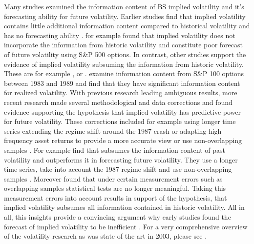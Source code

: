 Many studies examined the information content of \gls{BS} implied volatility and it's forecasting ability for future volatility. Earlier studies find that implied volatility contains little additional information content compared to historical volatility and has no forecasting ability \parencite{jiang2003}. \textcite{canina1993} for example found that implied volatility does not incorporate the information from historic volatility and constitute poor forecast of future volatility using S\&P 500 options. In contrast, other studies  support the evidence of implied volatility subsuming the information from historic volatility. These are for example \textcite{day1992}, \textcite{lamoureux1993} or \textcite{jorion1995}. \textcite{day1992} examine information content from S\&P 100 options between 1983 and 1989 and find that they have significant information content for realized volatility. With previous research leading ambiguous results, more recent research made several methodological and data corrections and found evidence supporting the hypothesis that implied volatility has predictive power for future volatility. These corrections included for example using longer time series extending the regime shift around the 1987 crash or adapting high-frequency asset returns to provide a more accurate view or use non-overlapping samples \parencite{jiang2003}. For example \textcite{christensen1998} find that subsumes the information content of past volatility and outperforms it in forecasting future volatility. They use a longer time series, take into account the 1987 regime shift and use non-overlapping samples \parencite{jiang2003}. Moreover \textcite{christensen2001} found that under certain measurement errors such as overlapping samples statistical tests are no longer meaningful. Taking this measurement errors into account results in support of the hypothesis, that implied volatility subsumes all information contained in historic volatility. All in all, this insights provide a convincing argument why early studies found the forecast of implied volatility to be inefficient \parencite{jiang2003}. For a very comprehensive overview of the volatility research as was state of the art in 2003, please see \textcite{poon}. \\
%
